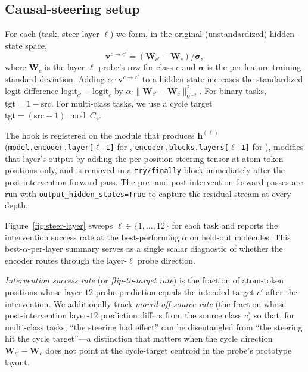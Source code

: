 \subsection{Causal-steering setup}

 For each (task, steer layer $\ell$) we form, in the original (unstandardized) hidden-state space,
\[
\mathbf{v}^{c \to c'} = (\mathbf{W}_{c'} - \mathbf{W}_{c}) / \boldsymbol{\sigma},
\]
where $\mathbf{W}_{c}$ is the layer-$\ell$ probe's row for class $c$ and $\boldsymbol{\sigma}$ is the per-feature training standard deviation. Adding $\alpha \cdot \mathbf{v}^{c \to c'}$ to a hidden state increases the standardized logit difference $\mathrm{logit}_{c'} - \mathrm{logit}_{c}$ by $\alpha \cdot \|\mathbf{W}_{c'} - \mathbf{W}_c\|_{\boldsymbol{\sigma}^{-2}}^2$. For binary tasks, $\mathrm{tgt} = 1 - \mathrm{src}$. For multi-class tasks, we use a cycle target $\mathrm{tgt} = (\mathrm{src} + 1) \bmod C_\tau$.

 The hook is registered on the module that produces $\mathbf{h}^{(\ell)}$ (\texttt{model.encoder.layer[$\ell$-1]} for \molm, \texttt{encoder.blocks.layers[$\ell$-1]} for \smi), modifies that layer's output by adding the per-position steering tensor at atom-token positions only, and is removed in a \texttt{try/finally} block immediately after the post-intervention forward pass. The pre- and post-intervention forward passes are run with \texttt{output\_hidden\_states=True} to capture the residual stream at every depth.

 Figure~\ref{fig:steer-layer} sweeps $\ell \in \{1, \ldots, 12\}$ for each task and reports the intervention success rate at the best-performing $\alpha$ on held-out molecules. This best-$\alpha$-per-layer summary serves as a single scalar diagnostic of whether the encoder routes through the layer-$\ell$ probe direction.

 \emph{Intervention success rate} (or \emph{flip-to-target rate}) is the fraction of atom-token positions whose layer-$12$ probe prediction equals the intended target $c'$ after the intervention. We additionally track \emph{moved-off-source rate} (the fraction whose post-intervention layer-$12$ prediction differs from the source class $c$) so that, for multi-class tasks, ``the steering had effect'' can be disentangled from ``the steering hit the cycle target''---a distinction that matters when the cycle direction $\mathbf{W}_{c'} - \mathbf{W}_{c}$ does not point at the cycle-target centroid in the probe's prototype layout.

